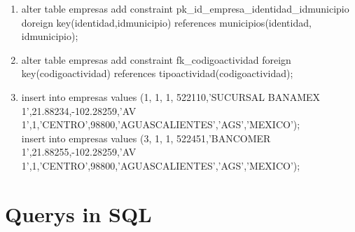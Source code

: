 \documentclass[10pt]{article}         %
\begin{document}
\begin{enumerate}
\item
	alter table empresas add constraint pk\_id\_empresa\_identidad\_idmunicipio doreign key(identidad,idmunicipio) references municipios(identidad, idmunicipio);
\item
alter table empresas add constraint fk\_codigoactividad foreign key(codigoactividad) references tipoactividad(codigoactividad);
\item
insert into empresas values (1, 1, 1, 522110,'SUCURSAL BANAMEX 1',21.88234,-102.28259,'AV 1',1,'CENTRO',98800,'AGUASCALIENTES','AGS','MEXICO');
\\
insert into empresas values (3, 1, 1, 522451,'BANCOMER 1',21.88255,-102.28259,'AV 1',1,'CENTRO',98800,'AGUASCALIENTES','AGS','MEXICO');

\end{enumerate}
\section{Querys in SQL}
\end{document}

